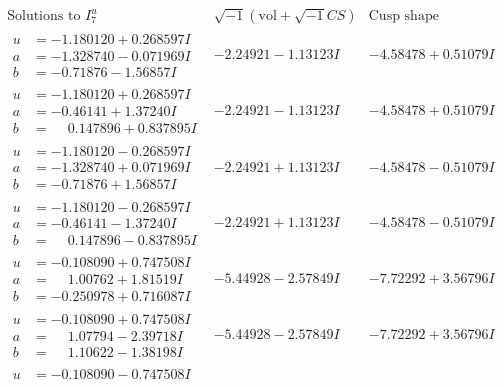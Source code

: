 \documentclass[1p]{elsarticle_modified}
\theoremstyle{definition}
\newcommand{\I}{\sqrt{-1}}
\begin{document}
$$\begin{array}{c|c|c}  
\text{Solutions to }I^u_{7}& \I (\text{vol} + \sqrt{-1}CS) & \text{Cusp shape}\\
 \hline 
\begin{aligned}
u &= -1.180120 + 0.268597 I \\
a &= -1.328740 - 0.071969 I \\
b &= -0.71876 - 1.56857 I\end{aligned}
 & -2.24921 - 1.13123 I & -4.58478 + 0.51079 I \\ \hline\begin{aligned}
u &= -1.180120 + 0.268597 I \\
a &= -0.46141 + 1.37240 I \\
b &= \phantom{-}0.147896 + 0.837895 I\end{aligned}
 & -2.24921 - 1.13123 I & -4.58478 + 0.51079 I \\ \hline\begin{aligned}
u &= -1.180120 - 0.268597 I \\
a &= -1.328740 + 0.071969 I \\
b &= -0.71876 + 1.56857 I\end{aligned}
 & -2.24921 + 1.13123 I & -4.58478 - 0.51079 I \\ \hline\begin{aligned}
u &= -1.180120 - 0.268597 I \\
a &= -0.46141 - 1.37240 I \\
b &= \phantom{-}0.147896 - 0.837895 I\end{aligned}
 & -2.24921 + 1.13123 I & -4.58478 - 0.51079 I \\ \hline\begin{aligned}
u &= -0.108090 + 0.747508 I \\
a &= \phantom{-}1.00762 + 1.81519 I \\
b &= -0.250978 + 0.716087 I\end{aligned}
 & -5.44928 - 2.57849 I & -7.72292 + 3.56796 I \\ \hline\begin{aligned}
u &= -0.108090 + 0.747508 I \\
a &= \phantom{-}1.07794 - 2.39718 I \\
b &= \phantom{-}1.10622 - 1.38198 I\end{aligned}
 & -5.44928 - 2.57849 I & -7.72292 + 3.56796 I \\ \hline\begin{aligned}
u &= -0.108090 - 0.747508 I \\

\end{aligned}
\end{array}$$
\end{document}
